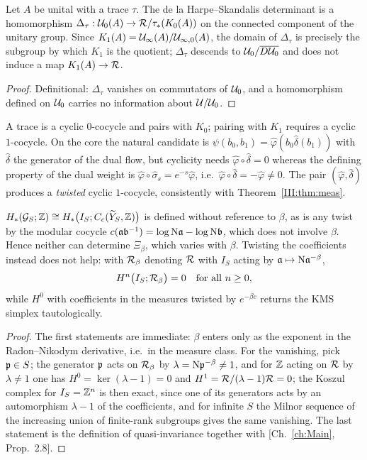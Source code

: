 \begin{proposition}\label{III:prop:dlhs}
Let $A$ be unital with a trace $\tau$. The de la Harpe--Skandalis determinant \cite{dlHS} is
a homomorphism $\Delta_\tau:\mathcal{U}_0(A)\to\mathcal{R}/\tau_*(K_0(A))$ on the connected component of the
unitary group. Since $K_1(A)=\mathcal{U}_\infty(A)/\mathcal{U}_{\infty,0}(A)$, the domain of $\Delta_\tau$ is
precisely the subgroup by which $K_1$ is the quotient; $\Delta_\tau$ descends to
$\mathcal{U}_0/\overline{D\mathcal{U}_0}$ and does not induce a map $K_1(A)\to\mathcal{R}$.
\end{proposition}

\begin{proof}
Definitional: $\Delta_\tau$ vanishes on commutators of $\mathcal{U}_0$, and a homomorphism defined
on $\mathcal{U}_0$ carries no information about $\mathcal{U}/\mathcal{U}_0$.
\end{proof}

\begin{remark}[Parity]\label{III:rem:parity}
A trace is a cyclic $0$-cocycle and pairs with $K_0$; pairing with $K_1$ requires a cyclic
$1$-cocycle. On the core the natural candidate is
$\psi(b_0,b_1)=\hat\varphi(b_0\hat\delta(b_1))$ with $\hat\delta$ the generator of the dual
flow, but cyclicity needs $\hat\varphi\circ\hat\delta=0$ whereas the defining property of the
dual weight is $\hat\varphi\circ\hat\sigma_s=e^{-s}\hat\varphi$, i.e.\
$\hat\varphi\circ\hat\delta=-\hat\varphi\ne0$. The pair $(\hat\varphi,\hat\delta)$ produces a
\emph{twisted} cyclic $1$-cocycle, consistently with Theorem~\ref{III:thm:meas}.
\end{remark}

\begin{proposition}\label{III:prop:homology}
$H_*(\mathcal{G}_S;\mathbb{Z})\cong H_*\bigl(I_S;C_c(\widetilde Y_S,\mathbb{Z})\bigr)$ is defined without reference
to $\beta$, as is any twist by the modular cocycle $c(\mathfrak{a}\mathfrak b^{-1})=\log\mathrm{N}\mathfrak{a}-\log\mathrm{N}\mathfrak b$,
which does not involve $\beta$. Hence neither can determine $\Xi_\beta$, which varies with
$\beta$. Twisting the coefficients instead does not help: with $\mathcal{R}_\beta$ denoting $\mathcal{R}$ with
$I_S$ acting by $\mathfrak{a}\mapsto\mathrm{N}\mathfrak{a}^{-\beta}$,
\[
H^n\bigl(I_S;\mathcal{R}_\beta\bigr)=0\quad\text{for all }n\ge0,
\]
while $H^0$ with coefficients in the measures twisted by $e^{-\beta c}$ returns the KMS
simplex tautologically.
\end{proposition}

\begin{proof}
The first statements are immediate: $\beta$ enters only as the exponent in the
Radon--Nikodym derivative, i.e.\ in the measure class. For the vanishing, pick $\mathfrak{p}\in S$;
the generator $\mathfrak{p}$ acts on $\mathcal{R}_\beta$ by $\lambda=\mathrm{N}\mathfrak{p}^{-\beta}\ne1$, and for $\mathbb{Z}$ acting
on $\mathcal{R}$ by $\lambda\ne1$ one has $H^0=\ker(\lambda-1)=0$ and $H^1=\mathcal{R}/(\lambda-1)\mathcal{R}=0$; the
Koszul complex for $I_S=\mathbb{Z}^n$ is then exact, since one of its generators acts by an
automorphism $\lambda-1$ of the coefficients, and for infinite $S$ the Milnor sequence of
the increasing union of finite-rank subgroups gives the same vanishing. The last statement is the definition of
quasi-invariance together with [Ch.~\ref{ch:Main}, Prop.~2.8].
\end{proof}

